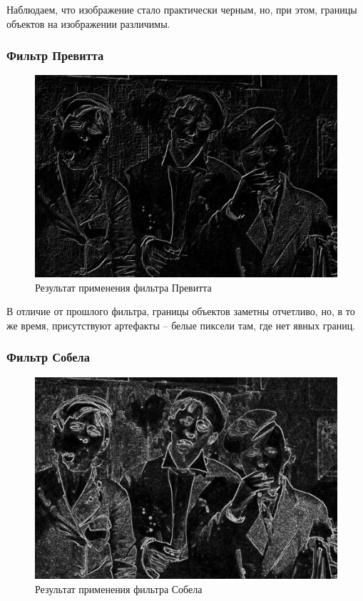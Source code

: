 Наблюдаем, что изображение стало практически черным, но, при этом, границы объектов на изображении различимы. 

\subsubsection{Фильтр Превитта}

\begin{figure}[ht!]
  \centering
  \includegraphics[width=\textwidth]{../Edge_Detection/Prewitt_Smoking_boys.jpg}
  \caption{Результат применения фильтра Превитта}
  \label{img:prewitt}  
\end{figure}
\FloatBarrier

В отличие от прошлого фильтра, границы объектов заметны отчетливо, но, в то же время, присутствуют артефакты -- белые пиксели там, где нет явных границ. 
\subsubsection{Фильтр Собела}

\begin{figure}[ht!]
  \centering
  \includegraphics[width=\textwidth]{../Edge_Detection/Sobel_Smoking_boys.jpg}
  \caption{Результат применения фильтра Собела}
  \label{img:sobel}  
\end{figure}
\FloatBarrier


